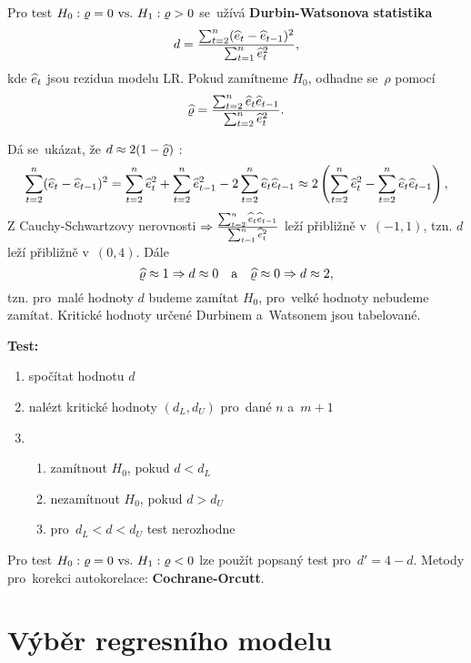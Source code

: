 Pro test $H_0: \varrho = 0 ~\text{vs.}~ H_1: \varrho > 0$ se~užívá \textbf{Durbin-Watsonova statistika}
 $$
d = \frac{\sum_{t = 2}^n(\widehat{e}_t - \widehat{e}_{t-1})^2}{\sum_{t = 1}^n \widehat{e}_t^2},
 $$
kde $\widehat{e}_t$ jsou rezidua modelu LR. Pokud zamítneme $H_0$, odhadne se~$\rho$ pomocí
 $$
\widehat{\varrho} = \frac{\sum_{t = 2}^n \widehat{e}_t \widehat{e}_{t-1}}{\sum_{t = 2}^n \widehat{e}_t^2}.
 $$

\newcommand{\sumtn}{\sum_{t = 2}^n}
\begin{remark}
Dá se~ukázat, že $d \approx 2(1-\widehat{\varrho})$ :
 $$
\sum_{t = 2}^n(\he_t - \he_{t-1})^2 = \sumtn \he_t^2 + \sumtn \he_{t-1}^2 - 2 \sumtn \he_t \he_{t-1} \approx 2 \left(\sumtn \he_t^2 - \sumtn \he_t \he_{t-1} \right),
 $$
Z Cauchy-Schwartzovy nerovnosti $\Rightarrow \frac{\sumtn \he_t \he_{t-1}}{\sum_{t = 1}^n \he_t^2}$ leží přibližně v~$(-1,1)$, tzn. $d$ leží přibližně v~$(0,4)$. Dále
 $$
\widehat{\varrho} \approx 1 \Rightarrow d \approx 0 \quad \text{a} \quad \widehat{\varrho} \approx 0 \Rightarrow d \approx 2,
 $$
tzn. pro~malé hodnoty $d$ budeme zamítat $H_0$, pro~velké hodnoty nebudeme zamítat. Kritické hodnoty určené Durbinem a~Watsonem jsou tabelované.
\end{remark}

\noindent \textbf{Test:}
\begin{enumerate}
	\item spočítat hodnotu $d$
	\item nalézt kritické hodnoty $(d_L,d_U)$ pro~dané $n$ a~$m+1$
	\item \begin{enumerate}
		\item zamítnout $H_0$, pokud $d < d_L$
		\item nezamítnout $H_0$, pokud $d > d_U$
		\item pro~$d_L < d < d_U$ test nerozhodne
	\end{enumerate}
\end{enumerate}

\begin{remark}
	Pro test $H_0: \varrho = 0 ~\text{vs.}~ H_1: \varrho < 0$ lze použít popsaný test pro~$d' = 4 - d$. Metody pro~korekci autokorelace: \textbf{Cochrane-Orcutt}.
\end{remark}

\chapter{Výběr regresního modelu}

